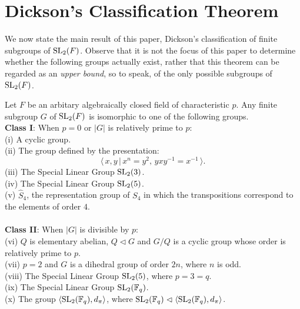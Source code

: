 \section{Dickson's Classification Theorem}

We now state the main result of this paper, Dickson's classification of finite subgroups of $\operatorname{SL}_2(F)$. Observe that it is not the focus of this paper to determine whether the following groups actually exist, rather that this theorem can be regarded as an \textit{upper bound}, so to speak, of the only possible subgroups of $\operatorname{SL}_2(F)$.\\

\begin{theorem}\label{mainresult} Let $F$ be an arbitary algebraically closed field of characteristic $p$. Any finite subgroup $G$ of $\operatorname{SL}_2(F)$ is isomorphic to one of the following groups. \vspace{3mm} \\
\textbf{Class I}: When $p=0$ or $|G|$ is relatively prime to $p$: \vspace{1mm} \\
(i) A cyclic group. \vspace{3mm} \\
(ii) The group defined by the presentation:
\begin{equation*} \langle \, x,y \, | \, x^n = y^2, \, yxy^{-1} = x^{-1} \, \rangle.
\end{equation*}
(iii) The Special Linear Group $\operatorname{SL}_2(3)$. \vspace{3mm} \\
(iv) The Special Linear Group $\operatorname{SL}_2(5)$. \vspace{3mm} \\
(v) $\widehat{S}_4$, the representation group of $S_4$ in which the transpositions correspond to the elements of order $4$. \\
\\
\textbf{Class II}: When $|G|$ is divisible by $p$: \vspace{1mm} \\
(vi) $Q$ is elementary abelian, $Q \vartriangleleft G$ and $G/Q$ is a cyclic group whose order is relatively prime to $p$. \vspace{3mm} \\
(vii) $p=2$ and $G$ is a dihedral group of order $2n$, where $n$ is odd. \vspace{3mm} \\
(viii) The Special Linear Group $\operatorname{SL}_2(5)$, where $p=3=q$. \vspace{3mm} \\
(ix) The Special Linear Group $\operatorname{SL}_2(\mathbb{F}_q)$. \vspace{3mm} \\
(x) The group $\langle \operatorname{SL}_2(\mathbb{F}_q), d_\pi \rangle$, where $\operatorname{SL}_2(\mathbb{F}_q) \vartriangleleft \langle \operatorname{SL}_2(\mathbb{F}_q), d_\pi \rangle$. \vspace{3mm} \\


\end{theorem}
